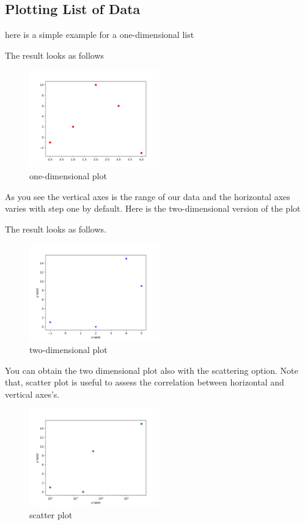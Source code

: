 \documentclass[10pt,a4paper]{article}
\begin{document}
\subsection{Plotting List of Data} \label{plot_list}
here is a simple example for a one-dimensional list

The result looks as follows
\begin{figure}[h]\centering \caption{one-dimensional plot}
\includegraphics[width=0.5\textwidth]{plot_list_data_1.png}
\end{figure}
As you see the vertical axes is the range of our data and the horizontal axes varies with step one by default. 
Here is the two-dimensional version of the plot

The result looks as follows. 
\begin{figure}[h]\centering \caption{two-dimensional plot}
\includegraphics[width=0.5\textwidth]{plot_list_data_2.png}
\end{figure}
You can obtain the two dimensional plot also with the scattering option. Note that, scatter plot is useful to assess the correlation between horizontal and vertical axes's.


\begin{figure}[h]\centering \caption{scatter plot}
\includegraphics[width=0.5\textwidth]{plot_list_data_3.png}
\end{figure}
\end{document}
